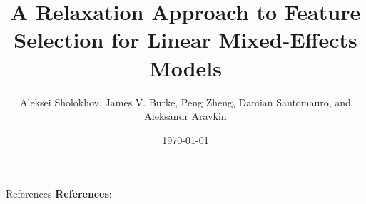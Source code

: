 \documentclass[8pt]{beamer}
\title{A Relaxation Approach to Feature Selection \newline for Linear Mixed-Effects Models}
\date{\today}
\author{Aleksei Sholokhov, James V. Burke, Peng Zheng, Damian Santomauro, and Aleksandr Aravkin}
\begin{document}
\maketitle



\begin{frame}{References}
	\textbf{References}: 
	
	
\end{frame}
\end{document}
